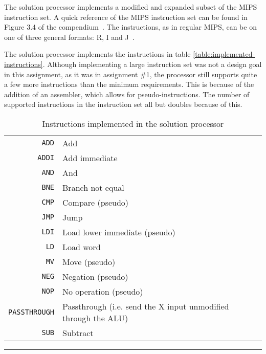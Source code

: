 The solution processor implements a modified and expanded subset of the MIPS instruction set.
A quick reference of the MIPS instruction set can be found in Figure 3.4 of the compendium~\cite[p.112]{compendium}.
The instructions, as in regular MIPS, can be on one of three general formats: R, I and J~\cite[p.109-11]{compendium}.

The solution processor implements the instructions in table \vref{table:implemented-instructions}.
Although implementing a large instruction set was not a design goal in this assignment, as it was in assignment \#1\cn, the processor still supports quite a few more instructions than the minimum requirements.
This is because of the addition of an assembler, which allows for pseudo-instructions.
The number of supported instructions in the instruction set all but doubles because of this.

\begin{table}[H]
    \begin{center}
        \begin{tabular}{r|l}
            \texttt{ADD} & Add \\
            \texttt{ADDI} & Add immediate \\
            \texttt{AND} & And \\
            \texttt{BNE} & Branch not equal \\
            \texttt{CMP} & Compare (pseudo) \\
            \texttt{JMP} & Jump \\
            \texttt{LDI} & Load lower immediate (pseudo) \\
            \texttt{LD} & Load word \\
            \texttt{MV} & Move (pseudo) \\
            \texttt{NEG} & Negation (pseudo) \\
            \texttt{NOP} & No operation (pseudo) \\
            \texttt{PASSTHROUGH} & Passthrough (i.e. send the X input unmodified through the ALU) \\
            \texttt{SUB} & Subtract \\
        \end{tabular}
        \smallskip
        \hrule
        \smallskip
        \caption{Instructions implemented in the solution processor}
        \label{table:implemented-instructions}
    \end{center}
\end{table}
